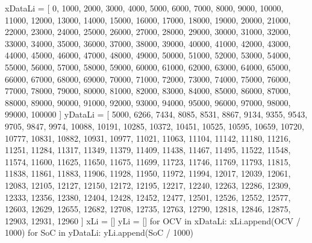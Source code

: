 \begin{pylabcode}[plotsession]
xDataLi = [ 0, 1000, 2000, 3000, 4000, 5000, 6000, 7000, 8000, 9000, 10000, 11000, 12000, 13000, 14000, 15000, 16000, 17000, 18000, 19000, 20000, 21000, 22000, 23000, 24000, 25000, 26000, 27000, 28000, 29000, 30000, 31000, 32000, 33000, 34000, 35000, 36000, 37000, 38000, 39000, 40000, 41000, 42000, 43000, 44000, 45000, 46000, 47000, 48000, 49000, 50000, 51000, 52000, 53000, 54000, 55000, 56000, 57000, 58000, 59000, 60000, 61000, 62000, 63000, 64000, 65000, 66000, 67000, 68000, 69000, 70000, 71000, 72000, 73000, 74000, 75000, 76000, 77000, 78000, 79000, 80000, 81000, 82000, 83000, 84000, 85000, 86000, 87000, 88000, 89000, 90000, 91000, 92000, 93000, 94000, 95000, 96000, 97000, 98000, 99000, 100000 ]
yDataLi = [ 5000, 6266, 7434, 8085, 8531, 8867, 9134, 9355, 9543, 9705, 9847, 9974, 10088, 10191, 10285, 10372, 10451, 10525, 10595, 10659, 10720, 10777, 10831, 10882, 10931, 10977, 11021, 11063, 11104, 11142, 11180, 11216, 11251, 11284, 11317, 11349, 11379, 11409, 11438, 11467, 11495, 11522, 11548, 11574, 11600, 11625, 11650, 11675, 11699, 11723, 11746, 11769, 11793, 11815, 11838, 11861, 11883, 11906, 11928, 11950, 11972, 11994, 12017, 12039, 12061, 12083, 12105, 12127, 12150, 12172, 12195, 12217, 12240, 12263, 12286, 12309, 12333, 12356, 12380, 12404, 12428, 12452, 12477, 12501, 12526, 12552, 12577, 12603, 12629, 12655, 12682, 12708, 12735, 12763, 12790, 12818, 12846, 12875, 12903, 12931, 12960 ]
xLi = []
yLi = []
for OCV in xDataLi:
    xLi.append(OCV / 1000)
for SoC in yDataLi:
    yLi.append(SoC / 1000)
    

\end{pylabcode}
